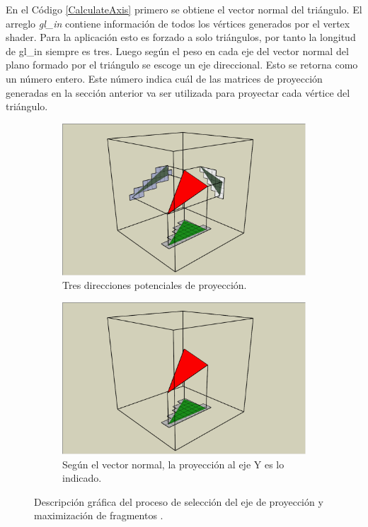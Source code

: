 En el Código \ref{CalculateAxis} primero se obtiene el vector normal del triángulo. El arreglo \emph{gl\_in} contiene información de todos los vértices generados por el vertex shader. Para la aplicación esto es forzado a solo triángulos, por tanto la longitud de gl\_in siempre es tres. Luego según el peso en cada eje del vector normal del plano formado por el triángulo se escoge un eje direccional. Esto se retorna como un número entero. Este número indica cuál de las matrices de proyección generadas en la sección anterior va ser utilizada para proyectar cada vértice del triángulo.

\begin{figure}[H]
	\centering
	\begin{subfigure}[t]{.49\linewidth}
		\centering
		\captionsetup{justification=centering}
		\includegraphics[width=\linewidth]{media/Voxelization_blog_fig_5.png}
		\caption*{Tres direcciones potenciales de proyección.}
	\end{subfigure}%
	\hspace{0.01\textwidth}
	\begin{subfigure}[t]{.49\linewidth}
		\centering
		\captionsetup{justification=centering}
		\includegraphics[width=\linewidth]{media/Voxelization_blog_fig_6.png}
		\caption*{Según el vector normal, la proyección al eje Y es lo indicado.}
	\end{subfigure}%
	\caption{Descripción gráfica del proceso de selección del eje de proyección y maximización de fragmentos \cite{gpuvoxelization}.}
	\label{fig:axis_selection}
\end{figure}

